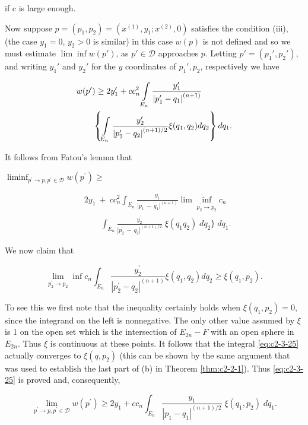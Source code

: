 if c is large enough.

Now suppose $p = (p_1, p_2) = (x^{(1)}, y_1; x^{(2)}, 0)$ satisfies the condition (iii), (the case $y_1 = 0$, $y_2 > 0$ is similar) in this case $w(p)$ is not defined and so we must estimate $\lim \inf w(p')$, as $p' \in \mathcal{D}$ approaches $p$. Letting $p' = (p_1', p_2')$, and writing $y_1'$ and $y_2'$ for the $y$ coordinates of $p_1', p_2$, respectively we have

\[
\begin{aligned}&w(p^{\prime})\geq2y_{1}^{\prime}+c c_{n}^{2}\intop_{E_{n}}\frac{y_{1}^{\prime}}{\left|p_{1}^{\prime}-q_{1}\right|^{(n+1)}}\\&\qquad\left\{\intop_{E_{n}}\frac{y_{2}^{\prime}}{\left|p_{2}^{\prime}-q_{2}\right|^{(n+1)/2}}\xi(q_{1},q_{2})d q_{2}\right\}d q_{1}.\end{aligned}
\]

It follows from Fatou's lemma that

$\liminf_{p^{\prime}\to p,p^{\prime}\in\mathcal{D}}w(p^{\prime})\geq$

\[
\begin{aligned}&2y_{1}\:+\:c c_{n}^{2}\int_{E_{n}}\frac{y_{1}}{\left|{p_{1}\:-\:q_{1}}\right|^{(n+1)}}\overline{{\lim\inf_{p_{2}^{^{\prime}}\to p_{2}}c_{n}}}\\&\qquad\int_{E_{n}}\frac{y_{2}^{^{\prime}}}{\left|{p_{2}^{^{\prime}}\:-\:q_{2}}\right|^{(n+1)/2}}\;\xi(q_{1}q_{2})\;d q_{2}\Bigg\}\;d q_{1}.\end{aligned}
\]

We now claim that

\begin{equation}\label{eq:c2-3-25}
\lim_{p_{2}^{\prime}\to p_{2}}\inf c_{n}\int_{E_{n}}\frac{y_{2}^{\prime}}{\left|p_{2}^{\prime}-q_{2}\right|^{(n+1)}}\xi(q_{1},q_{2})d q_{2}\geq\xi(q_{1},p_{2}).
\end{equation}

To see this we first note that the inequality certainly holds when $\xi(q_1, p_2) = 0$, since the integrand on the left is nonnegative. The only other value assumed by $\xi$ is 1 on the open set which is the intersection of $E_{2n} - F$ with an open sphere in $E_{2n}$. Thus $\xi$ is continuous at these points. It follows that the integral \eqref{eq:c2-3-25} actually converges to $\xi(q, p_2)$ (this can be shown by the same argument that was used to establish the last part of (b) in Theorem \ref{thm:c2-2-1}). Thus \eqref{eq:c2-3-25} is proved and, consequently,

\[
\lim_{p^{\prime}\to p,p^{\prime}\in\mathcal{D}}\displaystyle w(p^{\prime})\geq2y_{1}+c c_{n}\int_{E_{n}}\frac{y_{1}}{\left|{p_{1}-q_{1}}\right|^{(n+1)/2}}\;\xi(q_{1},p_{2})\;d q_{1}.
\]


